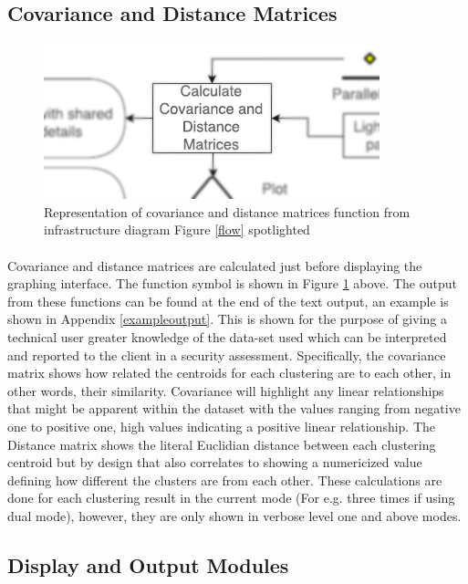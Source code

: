 \subsection{Covariance and Distance Matrices}
\label{infra5}

\begin{figure}[!h]
\centering
\includegraphics{./Figures/cov.png}
\caption{Representation of covariance and distance matrices function from infrastructure diagram Figure \ref{flow} spotlighted}
\label{cov}
\end{figure}

\paragraph{}Covariance and distance matrices are calculated just before displaying the graphing interface. The function symbol is shown in Figure \ref{cov} above. The output from these functions can be found at the end of the text output, an example is shown in Appendix \ref{exampleoutput}. This is shown for the purpose of giving a technical user greater knowledge of the data-set used which can be interpreted and reported to the client in a security assessment. Specifically, the covariance matrix shows how related the centroids for each clustering are to each other, in other words, their similarity. Covariance will highlight any linear relationships that might be apparent within the dataset with the values ranging from negative one to positive one, high values indicating a positive linear relationship. The Distance matrix shows the literal Euclidian distance between each clustering centroid but by design that also correlates to showing a numericized value defining how different the clusters are from each other. These calculations are done for each clustering result in the current mode (For e.g. three times if using dual mode), however, they are only shown in verbose level one and above modes.

\subsection{Display and Output Modules}
\label{infra6}

